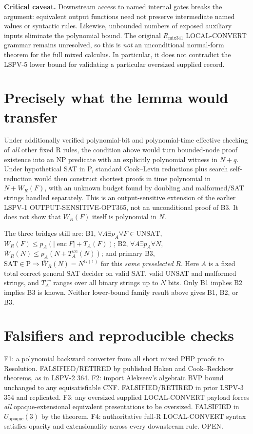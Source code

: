 \documentclass[11pt]{article}
\begin{document}
\noindent\textbf{Critical caveat.} Downstream access to named internal gates breaks the argument: equivalent output functions need not preserve intermediate named values or syntactic rules. Likewise, unbounded numbers of exposed auxiliary inputs eliminate the polynomial bound. The original $R_{\mathrm{mix341}}$ LOCAL-CONVERT grammar remains unresolved, so this is \emph{not} an unconditional normal-form theorem for the full mixed calculus. In particular, it does not contradict the LSPV-5 lower bound for validating a particular oversized supplied record.

\section*{Precisely what the lemma would transfer}
Under additionally verified polynomial-bit and polynomial-time effective checking of \emph{all} other fixed R rules, the condition above would turn bounded-node proof existence into an NP predicate with an explicitly polynomial witness in $N+q$. Under hypothetical SAT in P, standard Cook--Levin reductions plus search self-reduction would then construct shortest proofs in time polynomial in $N+W_R(F)$, with an unknown budget found by doubling and malformed/SAT strings handled separately. This is an output-sensitive extension of the earlier LSPV-1 OUTPUT-SENSITIVE-OPT365, not an unconditional proof of B3. It does not show that $W_R(F)$ itself is polynomial in $N$.

The three bridges still are: B1, $\forall A\exists p_A\forall F\in\mathrm{UNSAT}$, $W_R(F)\le p_A(|\operatorname{enc}F|+T_A(F))$; B2, $\forall A\exists p_A\forall N$, $\overline W_R(N)\le p_A(N+T_A^{wc}(N))$; and primary B3, $\mathrm{SAT}\in\mathrm P\Rightarrow\overline W_R(N)=N^{O(1)}$ for this \emph{same preselected} $R$. Here $A$ is a fixed total correct general SAT decider on valid SAT, valid UNSAT and malformed strings, and $T_A^{wc}$ ranges over all binary strings up to $N$ bits. Only B1 implies B2 implies B3 is known. Neither lower-bound family result above gives B1, B2, or B3.

\section*{Falsifiers and reproducible checks}
F1: a polynomial backward converter from all short mixed PHP proofs to Resolution. FALSIFIED/RETIRED by published Haken and Cook--Reckhow theorems, as in LSPV-2 364. F2: import Alekseev's algebraic BVP bound unchanged to any equisatisfiable CNF. FALSIFIED/RETIRED in prior LSPV-3 354 and replicated. F3: any oversized supplied LOCAL-CONVERT payload forces \emph{all} opaque-extensional equivalent presentations to be oversized. FALSIFIED in $U_{\mathrm{opaque}}(3)$ by the theorem. F4: authoritative full-R LOCAL-CONVERT syntax satisfies opacity and extensionality across every downstream rule. OPEN.
\end{document}
